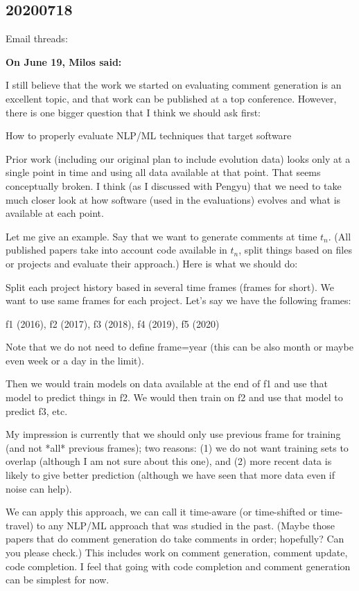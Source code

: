 \subsection{20200718}

Email threads:

\textbf{On June 19, Milos said:}

I still believe that the work we started on evaluating comment
generation is an excellent topic, and that work can be published at a
top conference.  However, there is one bigger question that I think we
should ask first:

How to properly evaluate NLP/ML techniques that target software

Prior work (including our original plan to include evolution data) looks
only at a single point in time and using all data available at that
point.  That seems conceptually broken.  I think (as I discussed with
Pengyu) that we need to take much closer look at how software (used in
the evaluations) evolves and what is available at each point.

Let me give an example.  Say that we want to generate comments at time
$t_n$.  (All published papers take into account code available in $t_n$,
split things based on files or projects and evaluate their approach.)
Here is what we should do:

Split each project history based in several time frames (frames for
short).  We want to use same frames for each project.  Let's say we have
the following frames:

f1 (2016), f2 (2017), f3 (2018), f4 (2019), f5 (2020)

Note that we do not need to define frame=year (this can be also month or
maybe even week or a day in the limit).

Then we would train models on data available at the end of f1 and use
that model to predict things in f2.  We would then train on f2 and use
that model to predict f3, etc.

My impression is currently that we should only use previous frame for
training (and not *all* previous frames); two reasons: (1) we do not
want training sets to overlap (although I am not sure about this one),
and (2) more recent data is likely to give better prediction (although
we have seen that more data even if noise can help).

We can apply this approach, we can call it time-aware (or time-shifted
or time-travel) to any NLP/ML approach that was studied in the past.
(Maybe those papers that do comment generation do take comments in
order; hopefully?  Can you please check.)  This includes work on comment
generation, comment update, code completion.  I feel that going with
code completion and comment generation can be simplest for now.

